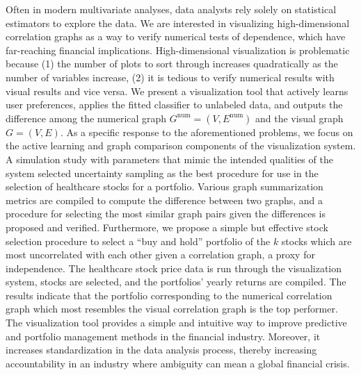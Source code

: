 Often in modern multivariate analyses, data analysts rely solely on statistical
estimators to explore the data. We are interested in visualizing 
high-dimensional correlation graphs as a way to verify numerical tests of 
dependence, which have far-reaching financial implications. High-dimensional 
visualization is problematic because (1) the number of plots to sort through 
increases quadratically as the number of variables increase, (2) it is tedious 
to verify numerical results with visual results and vice versa. We 
present a visualization tool that actively learns user preferences, applies 
the fitted classifier to unlabeled data, and outputs the difference among the 
numerical graph $G^{\text{num}}=(V,E^{\text{num}})$ and the visual graph 
$G=(V,E)$. 
As a specific response to the aforementioned problems, we focus on 
the active learning and graph comparison components of the visualization 
system. A simulation study with parameters that mimic the intended qualities of 
the system selected uncertainty sampling as the best procedure for use in the 
selection of healthcare stocks for a portfolio. Various graph summarization 
metrics are compiled to compute the difference between two graphs, and a 
procedure for selecting the most similar graph pairs given the differences is 
proposed and verified. 
Furthermore, we propose a simple but effective stock selection procedure to 
select a ``buy and hold'' portfolio of the $k$ stocks which are most 
uncorrelated with each other given a correlation graph, a proxy for 
independence. The healthcare stock price data is run through the visualization 
system, stocks are selected, and the portfolios' yearly returns are compiled. 
The results indicate that the portfolio 
corresponding to the numerical correlation graph which most resembles the 
visual correlation graph is the top performer. 
The visualization tool provides a simple and 
intuitive way to improve predictive and portfolio management methods in the 
financial industry. Moreover, it increases standardization in the data analysis 
process, thereby increasing accountability in an industry where ambiguity can 
mean a global financial crisis.
